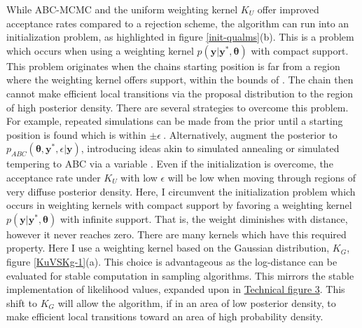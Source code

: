 While ABC-MCMC and the uniform weighting kernel $K_U$ offer improved acceptance rates compared to a rejection scheme, the algorithm can run into an initialization problem, as highlighted in figure \ref{init-qualms}(b). This is a problem which occurs when using a weighting kernel $p(\bm{y}|\bm{y^*},\bm{\theta})$ with compact support. This problem originates when the chains starting position is far from a region where the weighting kernel offers support, within the bounds of \pm\epsilon. The chain then cannot make efficient local transitions via the proposal distribution to the region of high posterior density. There are several strategies to overcome this problem. For example, repeated simulations can be made from the prior until a starting position is found which is within $\pm \epsilon\ $\citep{Sisson2010a}. Alternatively, \citet{Bortot2007} augment the posterior to $p_{ABC}(\bm{\theta},\bm{y^*},\epsilon|\bm{y})$, introducing ideas akin to simulated annealing or simulated tempering to ABC via a variable \epsilon. Even if the initialization is overcome, the acceptance rate under $K_U$ with low $\epsilon$ will be low when moving through regions of very diffuse posterior density.
Here, I circumvent the initialization problem which occurs in weighting kernels with compact support by favoring a weighting kernel $p(\bm{y}|\bm{y^*},\bm{\theta})$ with infinite support. That is, the weight diminishes with distance, however it never reaches zero. There are many kernels which have this required property. Here I use a weighting kernel based on the Gaussian distribution, $K_G$, figure \ref{KuVSKg-1}(a). This choice is advantageous as the log-distance can be evaluated for stable computation in sampling algorithms. This mirrors the stable implementation of likelihood values, expanded upon in \hyperref[tf3]{Technical figure 3}. This shift to $K_G$ will allow the algorithm, if in an area of low posterior density, to make efficient local transitions toward an area of high probability density.\par

